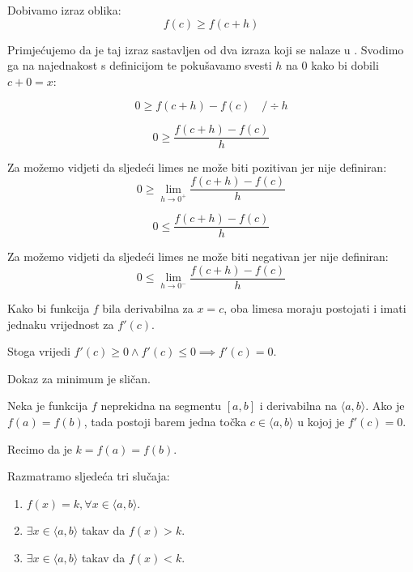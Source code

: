 Dobivamo izraz oblika:
$$
f(c)\geq f(c+h)
$$

Primjećujemo da je taj izraz sastavljen od dva izraza koji se nalaze u
.
Svodimo ga na najednakost s definicijom te pokušavamo svesti $h$ na $0$ kako bi
dobili $c+0=x$:

$$
0 \geq f(c+h) - f(c)\quad /\div h
$$

\begin{multicols}{2}
\begin{equation}
\label{eq:fermat_h_gt_zero}
0\geq\frac{f(c+h)-f(c)}{h}\tag{$h>0$}
\end{equation}

\noindent
Za  možemo vidjeti da sljedeći limes ne može
biti pozitivan jer nije definiran:
$$
    0\geq \lim_{h\to 0^+}\frac{f(c+h)-f(c)}{h}
$$

\newcolumn

\begin{equation}
\label{eq:fermat_h_lt_zero}
0\leq\frac{f(c+h)-f(c)}{h}\tag{$h<0$}
\end{equation}

\noindent
Za  možemo vidjeti da sljedeći limes ne može
biti negativan jer nije definiran:
$$
    0\leq \lim_{h\to 0^-}\frac{f(c+h)-f(c)}{h}
$$

\end{multicols}

Kako bi funkcija $f$ bila derivabilna za $x=c$, oba limesa moraju postojati i
imati jednaku vrijednost za $f'(c)$.

Stoga vrijedi $f'(c)\geq 0 \land f'(c)\leq 0 \implies f'(c)=0$.

Dokaz za minimum je sličan.

\begin{theorem}
    Neka je funkcija $f$ neprekidna na segmentu $[a,b]$ i derivabilna na $\langle a,b \rangle$.
    Ako je $f(a) = f(b)$, tada postoji barem jedna točka $c\in\langle a,b \rangle$
    u kojoj je $f'(c)=0$.

\end{theorem}

Recimo da je $k=f(a)=f(b)$.

\noindent
Razmatramo sljedeća tri slučaja:
\begin{enumerate}
    \item $f(x) = k, \forall x\in \langle a,b \rangle$.
    \item $\exists x\in \langle a,b \rangle$ takav da $f(x) > k$.
    \item $\exists x\in \langle a,b \rangle$ takav da $f(x) < k$.
\end{enumerate}

